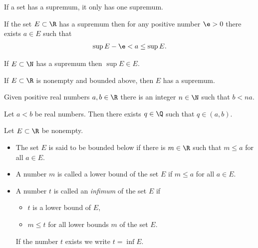 \documentclass{article}
\begin{document}
\setcounter{theorem}{3}
\begin{lemma}
    If a set has a supremum, it only has one supremum.    
\end{lemma}

\begin{theorem} 
    If the set $E\subset\R$ has a supremum then for any positive number $\e>0$ there exists $a\in E$
    such that
    \begin{align*}
        \sup E -\e < a \leq \sup E.
    \end{align*}
\end{theorem}

\begin{lemma}
    If $E\subset\N$ has a supremum then $\sup E\in E$.
\end{lemma}

\begin{definition*}
    If $E\subset\R$ is nonempty and bounded above, then $E$ has a supremum. 
\end{definition*}

\begin{theorem}
    Given positive real numbers $a,b\in\R$ there is an integer $n\in\N$ such that $b<na$. 
\end{theorem}

\setcounter{theorem}{8}
\begin{theorem}
    Let $a<b$ be real numbers. Then there exists $q\in\Q$ such that $q\in(a,b)$. 
\end{theorem}

\begin{definition}
    Let $E\subset\R$ be nonempty.
    \begin{itemize}
        \item The set $E$ is said to be bounded below if there is $m\in\R$ such that $m\leq a$ for all $a\in E$.
        \item A number $m$ is called a lower bound of the set $E$ if $m\leq a$ for all $a\in E$.
        \item A number $t$ is called an \emph{infimum} of the set $E$ if \begin{itemize}
            \item $t$ is a lower bound of $E$,
            \item $m\leq t$ for all lower bounds $m$ of the set $E$.
        \end{itemize}
        If the number $t$ exists we write $t=\inf E$.
    \end{itemize}
\end{definition}
\end{document}
